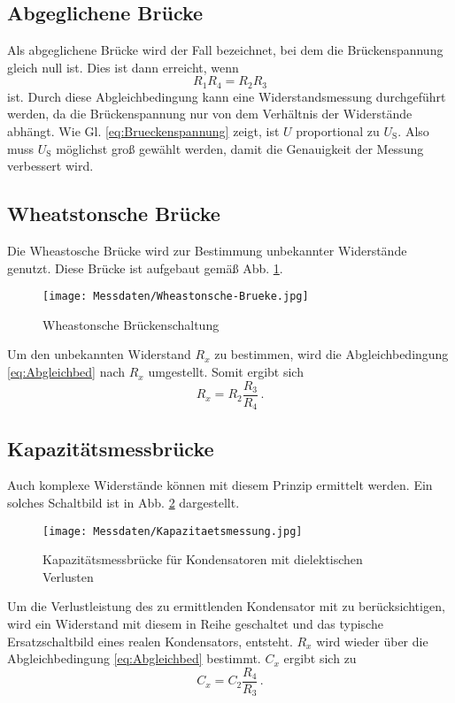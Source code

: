     \subsection{Abgeglichene Brücke}
    Als abgeglichene Brücke wird der Fall bezeichnet, bei dem die Brückenspannung gleich null ist.
    Dies ist dann erreicht, wenn
    \begin{equation}
        R_1 R_4 = R_2 R_3
        \label{eq:Abgleichbed}
    \end{equation}
    ist.
    Durch diese Abgleichbedingung kann eine Widerstandsmessung durchgeführt werden, da die Brückenspannung
    nur von dem Verhältnis der Widerstände abhängt.
    Wie Gl. \eqref{eq:Brueckenspannung} zeigt, ist $U$ proportional zu $U_{\text{S}}$.
    Also muss $U_{\text{S}}$ möglichst groß gewählt werden, damit die Genauigkeit der Messung verbessert wird.
    \subsection{Wheatstonsche Brücke}
    Die Wheastosche Brücke wird zur Bestimmung unbekannter Widerstände genutzt.
    Diese Brücke ist aufgebaut gemäß Abb. \ref{fig:Wheastonsche_Bruecke}.
    \begin{figure}
        \centering
        \texttt{[image: Messdaten/Wheastonsche-Brueke.jpg]}
        \caption{Wheastonsche Brückenschaltung}
        \label{fig:Wheastonsche_Bruecke}
    \end{figure}
    Um den unbekannten Widerstand $R_x$ zu bestimmen, wird die Abgleichbedingung \eqref{eq:Abgleichbed} nach $R_x$ umgestellt.
    Somit ergibt sich
    \begin{equation*}
        R_x = R_2 \frac{R_3}{R_4} \, \text{.}
    \end{equation*}
    \subsection{Kapazitätsmessbrücke}
    Auch komplexe Widerstände können mit diesem Prinzip ermittelt werden.
    Ein solches Schaltbild ist in Abb. \ref{fig:Kapatitaetsmessbruecke} dargestellt.
    \begin{figure}
        \centering
        \texttt{[image: Messdaten/Kapazitaetsmessung.jpg]}
        \caption{Kapazitätsmessbrücke für Kondensatoren mit dielektischen Verlusten}
        \label{fig:Kapatitaetsmessbruecke}
    \end{figure}
    Um die Verlustleistung des zu ermittlenden Kondensator mit zu berücksichtigen, wird ein Widerstand mit diesem in Reihe geschaltet
    und das typische Ersatzschaltbild eines realen Kondensators, entsteht.
    $R_x$ wird wieder über die Abgleichbedingung \eqref{eq:Abgleichbed} bestimmt.
    $C_x$ ergibt sich zu
    \begin{equation}
         C_x = C_2 \frac{R_4}{R_3} \, \text{.}
         \label{eq:kapawiderstand}
    \end{equation}
